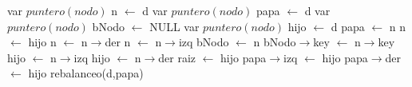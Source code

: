 \begin{algorithm}\phantom{[H]}
\begin{algorithmic}[1]
    
      \State var $puntero(nodo)$ n $\gets$ d 
      \State var $puntero(nodo)$ papa $\gets$ d 
      \State var $puntero(nodo)$ bNodo $\gets$ NULL 
      \State var $puntero(nodo)$ hijo $\gets$ d 
       
         \State papa $\gets$ n 
         \State n $\gets$ hijo 
           
            \State n $\gets$ n$\rightarrow$der 
         \Else
            \State n $\gets$ n$\rightarrow$izq 
         \EndIf
          
            \State bNodo $\gets$ n 
         \EndIf         
      \EndWhile   
       
         \State bNodo$\rightarrow$key $\gets$ n$\rightarrow$key 
          
            \State hijo $\gets$ n$\rightarrow$izq 
         \Else
            \State hijo $\gets$ n$\rightarrow$der 
         \EndIf
           
            \State raiz $\gets$ hijo 
         \Else
              
              \State papa$\rightarrow$izq $\gets$ hijo 
            \Else
              \State papa$\rightarrow$der $\gets$ hijo 
            \EndIf
            \State rebalanceo(d,papa) 
         \EndIf
      \EndIf  
   \EndIf     
\EndFunction
\end{algorithmic}
\end{algorithm}



